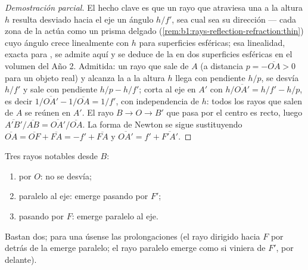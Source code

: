 \begin{proof}[Demostración parcial]
El hecho clave es que un rayo que atraviesa una  a la altura
$h$ resulta desviado hacia el eje un ángulo $h/f'$, sea cual sea su
dirección --- cada zona de la  actúa como un prisma delgado
(\cref{rem:b1:rays-reflection-refraction:thin}) cuyo ángulo crece
linealmente con $h$ para superficies esféricas; esa linealidad, exacta
para , se admite aquí y se deduce de la  en
dos superficies esféricas en el volumen del Año 2. Admitida: un rayo que
sale de $A$ (a distancia $p = -\overline{OA} > 0$ para un objeto real) y
alcanza la  a la altura $h$ llega con pendiente $h/p$, se desvía
$h/f'$ y sale con pendiente $h/p - h/f'$; corta al eje en $A'$ con
$h/\overline{OA'} = h/f' - h/p$, es decir $1/\overline{OA'}
- 1/\overline{OA} = 1/f'$, con independencia de $h$: todos los rayos que
salen de $A$ se reúnen en $A'$. El rayo $B \to O \to B'$ que pasa por el
centro es recto, luego
$\overline{A'B'}/\overline{AB} = \overline{OA'}/\overline{OA}$. La forma
de Newton se sigue sustituyendo $\overline{OA} = \overline{OF} + \overline{FA}
= -f' + \overline{FA}$ y $\overline{OA'} = f' + \overline{F'A'}$.
\end{proof}

\begin{method}\label{met:b1:mirrors-thin-lenses:lensrays}
Tres rayos notables desde $B$:
\begin{enumerate}
  \item por $O$: no se desvía;
  \item paralelo al eje: emerge pasando por $F'$;
  \item pasando por $F$: emerge paralelo al eje.
\end{enumerate}
Bastan dos; para una  úsense las prolongaciones (el rayo
dirigido hacia $F$ por detrás de la  emerge paralelo; el rayo
paralelo emerge como si viniera de $F'$, por delante).
\end{method}


